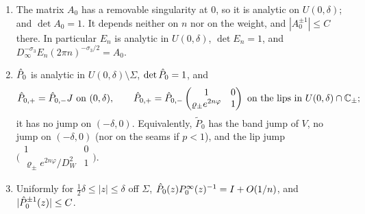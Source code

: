 \begin{lemma}\label{lem:comparison-parametrix}
\begin{enumerate}
\item[(i)] The matrix $A_0$ has a removable singularity at $0$, so it is analytic on $U(0,\delta)$; and $\det A_0=1$.
  It depends neither on $n$ nor on the
  weight, and $|A_0^{\pm1}|\le C$ there. In particular $E_n$ is analytic in $U(0,\delta)$, $\det E_n=1$, and
  $D_\infty^{-\sigma_3}E_n(2\pi n)^{-\sigma_3/2}=A_0$.
\item[(ii)] $\hat P_0$ is analytic in $U(0,\delta)\setminus\Sigma$, $\det\hat P_0=1$, and
  \[
    \hat P_{0,+}=\hat P_{0,-}J\ \text{on }(0,\delta),\qquad
    \hat P_{0,+}=\hat P_{0,-}\begin{pmatrix}1&0\\\varrho_\pm e^{2n\varphi}&1\end{pmatrix}\ \text{on the lips in }U(0,\delta)\cap\mathbb{C}_\pm;
  \]
  it has no jump on $(-\delta,0)$. Equivalently, $\tilde P_0$ has the band jump of $V$, no jump on $(-\delta,0)$ (nor on
  the seams if $p<1$), and the lip jump $\bigl(\begin{smallmatrix}1&0\\\varrho_\pm e^{2n\varphi}/D_W^2&1\end{smallmatrix}\bigr)$.
\item[(iii)] Uniformly for $\frac12\delta\le|z|\le\delta$ off $\Sigma$, $\hat P_0(z)P^\infty_0(z)^{-1}=I+O(1/n)$, and
  $|\hat P_0^{\pm1}(z)|\le C$.
\end{enumerate}
\end{lemma}

